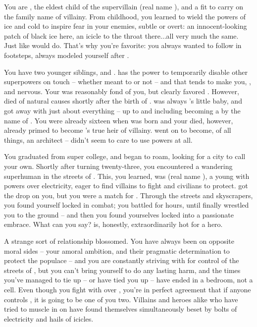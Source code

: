 \documentclass[char]{LRSguildcamp1}
\begin{document}
\name{\cOldest{}}

You are \cOldest{\intro}, the eldest child of the supervillain \cGrandma{\MYsupername} (real name \cGrandma{\intro}), and a \cOldest{\offspring} fit to carry on the family name of villainy.  
From childhood, you learned to wield the powers of ice and cold to inspire fear in your enemies, subtle or overt: an innocent-looking patch of black ice here, an icicle to the throat there...all very much the same. 
Just like \cGrandma{} would do.  That's why you're \cGrandma{\their} favorite: you always wanted to follow in \cGrandma{\their} footsteps, always modeled yourself after \cGrandma{\them}. %

You have two younger siblings, \cArchitect{} and \cYoungest{}.  \cArchitect{} has the power to temporarily disable other superpowers on touch -- whether \cArchitect{\they} meant to or not -- and that tends to make you, \cYoungest{}, and \cGrandma{} nervous.  Your \cGS{\parent} \cGS{\intro} was reasonably fond of you, but clearly favored \cArchitect{}.  However, \cGS{} died of natural causes shortly after the birth of \cYoungest{}. \cYoungest{} was always \cGrandma{}'s little baby, and got away with just about everything -- up to and including becoming a \cYoungest{\hero} by the name of \cYoungest{\MYsupername}.  You were already sixteen when \cYoungest{} was born and your \cGS{\parent} died, however, already primed to become \cGrandma{}'s true heir of villainy.  \cArchitect{} went on to become, of all things, an architect -- \cArchitect{\they} didn't seem to care to use \cArchitect{\their} powers at all.

You graduated from super college, and began to roam, looking for a city to call your own.  Shortly after turning twenty-three, you encountered a wandering superhuman in the streets of \pCityO{}.  This, you learned, was \cOS{\MYsupername} (real name \cOS{\intro}), a young \cOS{\hero} with powers over electricity, eager to find villains to fight and civilians to protect.  \cOS{\They} got the drop on you, but you were a match for \cOS{\them}.   Through the streets and skyscrapers, you found yourself locked in combat; you battled for hours, until \cOS{\they} finally wrestled you to the ground -- and then you found yourselves locked into a passionate embrace.  What can you say?  \cOS{} is, honestly, extraordinarily hot for a hero.

A strange sort of relationship blossomed.  You have always been on opposite moral sides -- your amoral ambition, and their pragmatic determination to protect the populace -- and you are constantly striving with \cOS{\them} for control of the streets of \pCityO{}, but you can't bring yourself to do \cOS{\them} any lasting harm, and the times you've managed to tie \cOS{\them} up -- or \cOS{\they} have tied you up -- have ended in a bedroom, not a cell.
Even though you fight with \cOS{} over \pCityO{}, you're in perfect agreement that if anyone controls \pCityO{}, it is going to be one of you two.  Villains and heroes alike who have tried to muscle in on \pCityO{} have found themselves simultaneously beset by bolts of electricity and hails of icicles.
\end{document}
